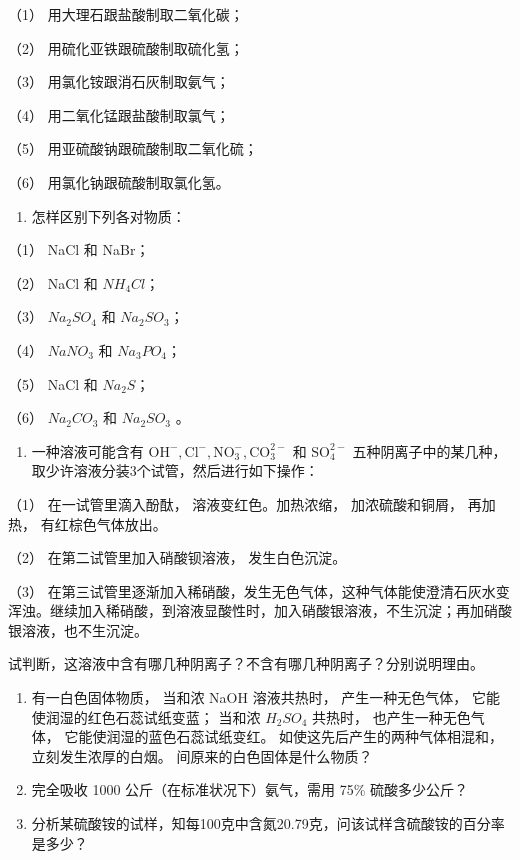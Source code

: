 （1） 用大理石跟盐酸制取二氧化碳；

（2） 用硫化亚铁跟硫酸制取硫化氢；

（3） 用氯化铵跟消石灰制取氨气；

（4） 用二氧化锰跟盐酸制取氯气；

（5） 用亚硫酸钠跟硫酸制取二氧化硫；

（6） 用氯化钠跟硫酸制取氯化氢。

\begin{enumerate}[start=21]
\item
  怎样区别下列各对物质：
\end{enumerate}

（1） NaCl 和 NaBr；

（2） NaCl 和 \(NH_{4}Cl\)；

（3） \(Na_{2}SO_{4}\) 和 \(Na_{2}SO_{3}\)；

（4） \(NaNO_{3}\) 和 \(Na_{3}PO_{4}\)；

（5） NaCl 和 \(Na_{2}S\)；

（6） \(Na_{2}CO_{3}\) 和 \(Na_{2}SO_{3}\) 。

\begin{enumerate}[start=22]
\item
  一种溶液可能含有
  \(\mathrm{OH}^{-}, \mathrm{Cl}^{-}, \mathrm{NO}_{3}^{-}, \mathrm{CO}_{3}^{2-}\)
  和 \(\mathrm{SO}_{4}^{2-}\)
  五种阴离子中的某几种，取少许溶液分装3个试管，然后进行如下操作：
\end{enumerate}

（1） 在一试管里滴入酚酞， 溶液变红色。加热浓缩， 加浓硫酸和铜屑，
再加热， 有红棕色气体放出。

（2） 在第二试管里加入硝酸钡溶液， 发生白色沉淀。

（3）
在第三试管里逐渐加入稀硝酸，发生无色气体，这种气体能使澄清石灰水变浑浊。继续加入稀硝酸，到溶液显酸性时，加入硝酸银溶液，不生沉淀；再加硝酸银溶液，也不生沉淀。

试判断，这溶液中含有哪几种阴离子？不含有哪几种阴离子？分别说明理由。

\begin{enumerate}[start=23]
\item
  有一白色固体物质， 当和浓 NaOH 溶液共热时， 产生一种无色气体，
  它能使润湿的红色石蕊试纸变蓝； 当和浓 \(H_{2}SO_{4}\) 共热时，
  也产生一种无色气体， 它能使润湿的蓝色石蕊试纸变红。
  如使这先后产生的两种气体相混和， 立刻发生浓厚的白烟。
  间原来的白色固体是什么物质？
\item
  完全吸收 1000 公斤（在标准状况下）氨气，需用 75\% 硫酸多少公斤？
\item
  分析某硫酸铵的试样，知每100克中含氮20.79克，问该试样含硫酸铵的百分率是多少？
\end{enumerate}


